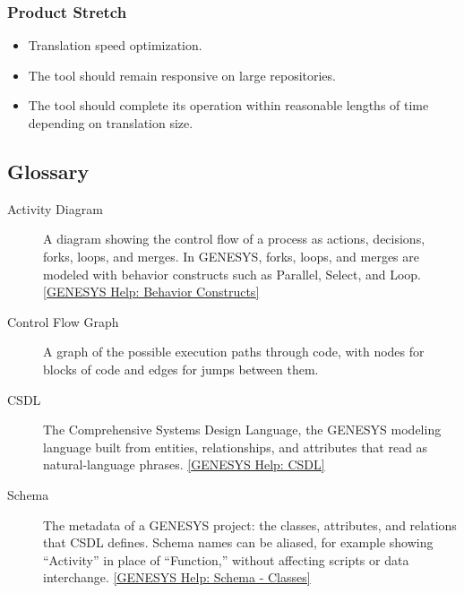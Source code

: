 \subsection{Product Stretch}

\begin{itemize}
  \item Translation speed optimization.
  \item The tool should remain responsive on large repositories. 
  \item The tool should complete its operation within reasonable lengths of time depending on translation size.
\end{itemize}

 \newpage
\begin{appendices}

\chapter{Glossary}
\label{app:glossary}

\begin{description}
  \item[Activity Diagram] A diagram showing the control flow of a process as actions, decisions, forks, loops, and merges. In GENESYS, forks, loops, and merges are modeled with behavior constructs such as Parallel, Select, and Loop. \href{https://genesys-help.vitechcorp.com/genesys-help/behavior-constructs}{[GENESYS Help: Behavior Constructs]}

  \item[Control Flow Graph] A graph of the possible execution paths through code, with nodes for blocks of code and edges for jumps between them.

  \item[CSDL] The Comprehensive Systems Design Language, the GENESYS modeling language built from entities, relationships, and attributes that read as natural-language phrases. \href{https://genesys-help.vitechcorp.com/genesys-help/language-the-comprehensive-systems-design-language-csdl}{[GENESYS Help: CSDL]}

  \item[Schema] The metadata of a GENESYS project: the classes, attributes, and relations that CSDL defines. Schema names can be aliased, for example showing ``Activity'' in place of ``Function,'' without affecting scripts or data interchange. \href{https://genesys-help.vitechcorp.com/genesys-help/schema-classes}{[GENESYS Help: Schema - Classes]}


\end{description}
\end{appendices}
